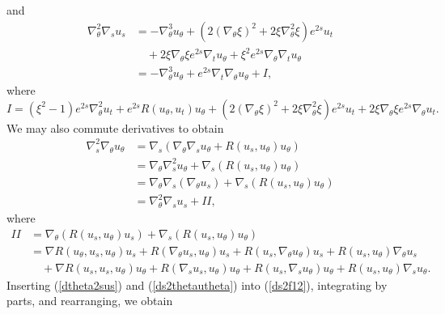\documentclass[12pt]{amsart}
\theoremstyle{others}
\numberwithin{equation}{section}
\begin{document}
and
\begin{equation}\label{dtheta2sus}
\begin{split}
\nabla_\theta^2 \nabla_s u_s & = - \nabla^3_\theta u_\theta + \left( 2 (\nabla_\theta \xi)^2 + 2 \xi \nabla^2_\theta \xi \right) e^{2s} u_t \\
& \quad + 2 \xi \nabla_\theta \xi e^{2s} \nabla_t u_\theta + \xi^2 e^{2s} \nabla_\theta \nabla_t u_\theta \\
& = - \nabla^3_\theta u_\theta + e^{2s} \nabla_t \nabla_\theta u_\theta + I,
\end{split}
\end{equation}
where
\begin{equation}\label{I}
I = (\xi^2 - 1) e^{2s} \nabla_\theta^2 u_t + e^{2s} R(u_\theta, u_t) u_\theta + \left( 2 (\nabla_\theta \xi)^2 + 2 \xi \nabla^2_\theta \xi \right) e^{2s} u_t + 2 \xi \nabla_\theta \xi e^{2s} \nabla_\theta u_t.
\end{equation}
We may also commute derivatives to obtain
\begin{equation}\label{ds2thetautheta}
\begin{split}
\nabla_s^2 \nabla_\theta u_\theta & = \nabla_s \left( \nabla_\theta \nabla_s u_\theta + R(u_s, u_\theta) u_\theta \right) \\
& = \nabla_\theta \nabla_s^2 u_\theta + \nabla_s \left( R(u_s, u_\theta) u_\theta \right) \\
& = \nabla_\theta \nabla_s ( \nabla_\theta u_s ) + \nabla_s \left( R(u_s, u_\theta) u_\theta \right) \\
& = \nabla_\theta^2 \nabla_s u_s + I \! I,
\end{split}
\end{equation}
where
\begin{equation}\label{II}
\begin{split}
I\! I & = \nabla_\theta \left( R(u_s, u_\theta) u_s \right) + \nabla_s \left( R(u_s, u_\theta) u_\theta \right) \\
& = \nabla R \left( u_\theta, u_s, u_\theta \right) u_s + R(\nabla_\theta u_s, u_\theta) u_s +R( u_s, \nabla_\theta u_\theta) u_s + R(u_s, u_\theta) \nabla_\theta u_s \\
& \quad + \nabla R \left( u_s, u_s, u_\theta \right) u_\theta + R(\nabla_s u_s, u_\theta) u_\theta + R( u_s, \nabla_s u_\theta) u_\theta + R( u_s, u_\theta) \nabla_s u_\theta.
\end{split}
\end{equation}
Inserting (\ref{dtheta2sus}) and (\ref{ds2thetautheta}) into (\ref{ds2f12}), integrating by parts, and rearranging, we obtain
\end{document}
